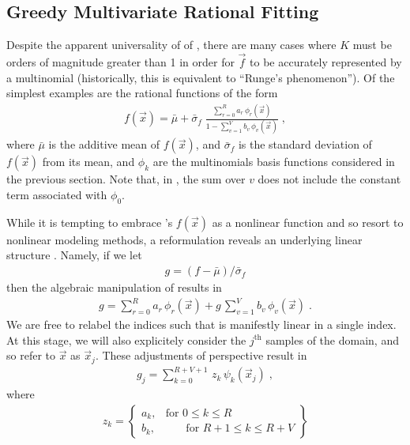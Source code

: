 \documentclass[twocolumn,aps,prd,floatfix,preprintnumbers,a4paper,nofootinbib,
superscriptaddress,10pt]{revtex4-1}
\begin{document}
\subsection{Greedy Multivariate Rational Fitting}
%
%
\par Despite the apparent universality of of , there are many cases where $K$ must be orders of magnitude greater than 1 in order for $\vec{f}$ to be accurately represented by a multinomial (historically, this is equivalent to ``Runge's phenomenon'').
%
Of the simplest examples are the rational functions of the form
%
\def\muf{\bar{\mu}}
\def\sif{\bar{\sigma}_f}
\begin{align}
  \label{eq:rat1}
  f(\vec{x}) = \muf + \sif \; \frac{ \sum_{r=0}^{R} a_r \, \phi_{r}(\vec{x}) }{ 1 - \sum_{v=1}^{V} b_v \, \phi_{v}(\vec{x}) } \;,
\end{align}
%
where $\muf$ is the additive mean of $f(\vec{x})$, and $\sif$ is the standard deviation of $f(\vec{x})$ from its mean, and $\phi_k$ are the multinomials basis functions considered in the previous section.
%
Note that, in , the sum over $v$ does not include the constant term associated with $\phi_0$.
%
\par While it is tempting to embrace 's $f({\vec{x}})$ as a nonlinear function and so resort to nonlinear modeling methods, a reformulation reveals an underlying linear structure \cite{Press:1992:NRC:148286}.
%
Namely, if we let
%
\begin{align}
  g = (f - \muf)/\sif
\end{align}
%
then the algebraic manipulation of  results in
%
\begin{align}
  \label{eq:rat2}
  g = \sum_{r=0}^{R} a_r \, \phi_{r}(\vec{x}) + g\, \sum_{v=1}^{V} b_v \, \phi_{v}(\vec{x}) \; .
\end{align}
%
We are free to relabel the indices such that  is manifestly linear in a single index.
%
At this stage, we will also explicitely consider the $j^\mathrm{th}$ samples of the domain, and so refer to $\vec{x}$ as $\vec{x}_j$.
%
These adjustments of perspective result in
%
\begin{align}
  \label{eq:rat3}
  g_j = \sum_{k=0}^{R+V+1} \, z_{k} \, \psi_k(\vec{x}_j) \;,
\end{align}
%
where
%
\begin{align}
  z_k = \left\{ \begin{array}{cc}
        a_k,      & \text{for }0\leq k\leq R\\
        b_k, & \quad \;\; \;\text{for }R+1\leq k\leq R+V
      \end{array} \right\}
\end{align}
\end{document}
